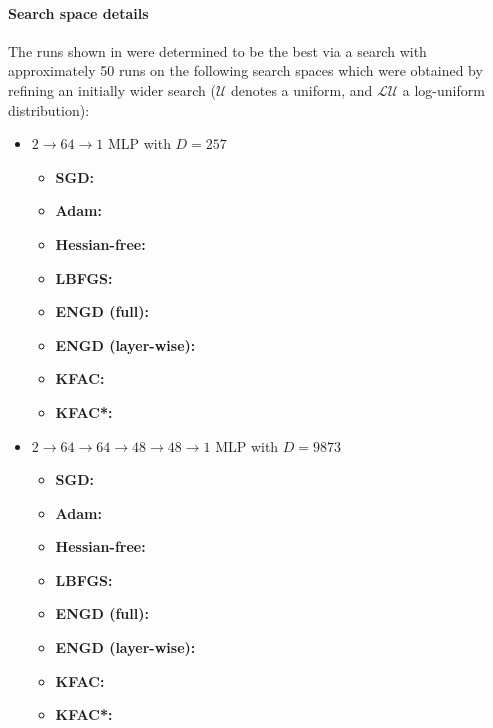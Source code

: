 \paragraph{Search space details} The runs shown in  were determined to be the best via a search with approximately 50 runs on the following search spaces which were obtained by refining an initially wider search ($\mathcal{U}$ denotes a uniform, and $\mathcal{LU}$ a log-uniform distribution):
\begin{itemize}
\item $2\to 64\to 1$ MLP with $D=257$
  \begin{itemize}
    \def\pathToRuns{kfac_pinns_exp/exp09_reproduce_poisson2d/tex}
  \item \textbf{SGD:} 
  \item \textbf{Adam:} 
  \item \textbf{Hessian-free:} 
  \item \textbf{LBFGS:} 
  \item \textbf{ENGD (full):} 
  \item \textbf{ENGD (layer-wise):} 
  \item \textbf{KFAC:} 
  \item \textbf{KFAC*:} 
  \end{itemize}

\item $2 \to 64 \to 64 \to 48 \to 48 \to 1$ MLP with $D=\num{9873}$
  \begin{itemize}
    \def\pathToRuns{kfac_pinns_exp/exp15_poisson2d_deepwide/tex}
  \item \textbf{SGD:} 
  \item \textbf{Adam:} 
  \item \textbf{Hessian-free:} 
  \item \textbf{LBFGS:} 
  \item \textbf{ENGD (full):} 
  \item \textbf{ENGD (layer-wise):} 
  \item \textbf{KFAC:} 
  \item \textbf{KFAC*:} 
  \end{itemize}


\end{itemize}
